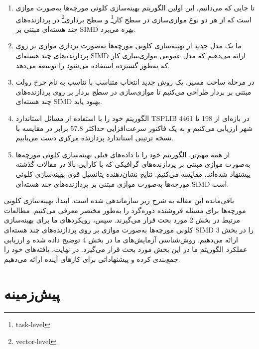 \documentclass[a4paper,10pt]{article}
\begin{document}
        \begin{enumerate}

            \item تا جایی که می‌دانیم، این اولین الگوریتم بهینه‌سازی کلونی مورچه‌ها به‌صورت موازی است که از هر دو نوع موازی‌سازی در سطح کار\footnote{\hspace{2pt}task-level} و سطح برداری\footnote{\hspace{2pt}vector-level} در پردازنده‌های چند هسته‌ای مبتنی بر SIMD بهره می‌برد.

            \item ما یک مدل جدید از بهینه‌سازی کلونی مورچه‌ها به‌صورت برداری موازی بر روی پردازنده‌های چند هسته‌ای SIMD ارائه می‌دهیم که مدل عمومی موازی‌سازی کار که به‌طور گسترده استفاده می‌شود را توسعه می‌دهد.

            \item در مرحله ساخت مسیر، یک روش جدید انتخاب متناسب با تناسب به نام چرخ رولت مبتنی بر بردار طراحی می‌کنیم تا موازی‌سازی در سطح بردار بر روی پردازنده‌های چند هسته‌ای SIMD بهبود یابد.

            \item الگوریتم خود را با استفاده از مسائل استاندارد TSPLIB در بازه‌ای از 198 تا 4461 شهر ارزیابی می‌کنیم و به یک فاکتور سرعت‌افزایی حداکثر 57.8 برابر در مقایسه با نسخه ترتیبی استاندارد پردازنده مرکزی دست می‌یابیم.

            \item از همه مهم‌تر، الگوریتم خود را با داده‌های قبلی بهینه‌سازی کلونی مورچه‌ها به‌صورت موازی مبتنی بر پردازنده‌های گرافیکی که با کارایی بالا در مقالات گذشته پیشنهاد شده‌اند، مقایسه می‌کنیم. نتایج نشان‌دهنده پتانسیل قوی بهینه‌سازی کلونی مورچه‌ها به‌صورت موازی مبتنی بر پردازنده‌های چند هسته‌ای SIMD است.

        \end{enumerate}

        باقی‌مانده این مقاله به شرح زیر سازماندهی شده است. ابتدا، بهینه‌سازی کلونی مورچه‌ها برای مسئله فروشنده دوره‌گرد را به‌طور مختصر معرفی می‌کنیم. مطالعات مرتبط در بخش 2 مورد بحث قرار می‌گیرند. سپس، رویکردهای ما برای بهینه‌سازی کلونی مورچه‌ها به‌صورت موازی بر روی پردازنده‌های چند هسته‌ای SIMD را در بخش 3 ارائه می‌دهیم. روش‌شناسی آزمایش‌های ما در بخش 4 توضیح داده شده و ارزیابی عملکرد الگوریتم ما در این بخش مورد بحث قرار می‌گیرد. در نهایت، یافته‌های خود را جمع‌بندی کرده و پیشنهاداتی برای کارهای آینده ارائه می‌دهیم.

    \section{پیش‌زمینه}

    
\end{document}
